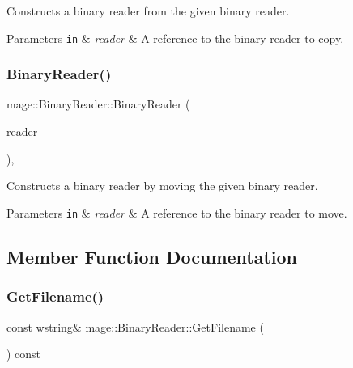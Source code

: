 Constructs a binary reader from the given binary reader.


\begin{DoxyParams}[1]{Parameters}
\mbox{\tt in}  & {\em reader} & A reference to the binary reader to copy. \\
\hline
\end{DoxyParams}
\hypertarget{classmage_1_1_binary_reader_a3a24db5c872cca270596d53989ac8c91}{}\label{classmage_1_1_binary_reader_a3a24db5c872cca270596d53989ac8c91} 
\subsubsection{\texorpdfstring{Binary\+Reader()}{BinaryReader()}\hspace{0.1cm}{\footnotesize\ttfamily [3/3]}}
{\footnotesize\ttfamily mage\+::\+Binary\+Reader\+::\+Binary\+Reader (\begin{DoxyParamCaption}\item[{\hyperlink{classmage_1_1_binary_reader}{Binary\+Reader} \&\&}]{reader }\end{DoxyParamCaption})\hspace{0.3cm}{\ttfamily [protected]}, {\ttfamily [default]}}

Constructs a binary reader by moving the given binary reader.


\begin{DoxyParams}[1]{Parameters}
\mbox{\tt in}  & {\em reader} & A reference to the binary reader to move. \\
\hline
\end{DoxyParams}


\subsection{Member Function Documentation}
\hypertarget{classmage_1_1_binary_reader_ad9d4a4a3e2f0afc666d15badff08fe4a}{}\label{classmage_1_1_binary_reader_ad9d4a4a3e2f0afc666d15badff08fe4a} 
\subsubsection{\texorpdfstring{Get\+Filename()}{GetFilename()}}
{\footnotesize\ttfamily const wstring\& mage\+::\+Binary\+Reader\+::\+Get\+Filename (\begin{DoxyParamCaption}{ }\end{DoxyParamCaption}) const\hspace{0.3cm}{\ttfamily [noexcept]}}

